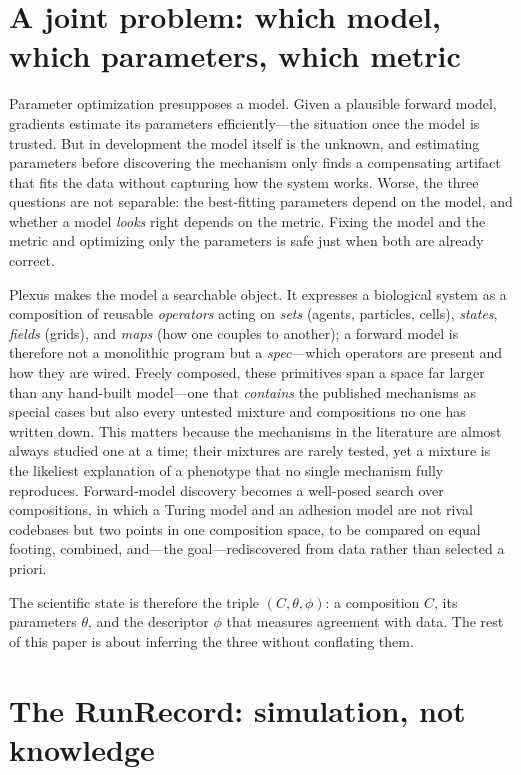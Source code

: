 \documentclass[11pt]{article}
\begin{document}
\section*{A joint problem: which model, which parameters, which metric}

Parameter optimization presupposes a model. Given a plausible forward model, gradients estimate its parameters efficiently---the situation once the model is trusted. But in development the model itself is the unknown, and estimating parameters before discovering the mechanism only finds a compensating artifact that fits the data without capturing how the system works. Worse, the three questions are not separable: the best-fitting parameters depend on the model, and whether a model \emph{looks} right depends on the metric. Fixing the model and the metric and optimizing only the parameters is safe just when both are already correct.

Plexus makes the model a searchable object. It expresses a biological system as a composition of reusable \emph{operators} acting on \emph{sets} (agents, particles, cells), \emph{states}, \emph{fields} (grids), and \emph{maps} (how one couples to another); a forward model is therefore not a monolithic program but a \emph{spec}---which operators are present and how they are wired. Freely composed, these primitives span a space far larger than any hand-built model---one that \emph{contains} the published mechanisms as special cases but also every untested mixture and compositions no one has written down. This matters because the mechanisms in the literature are almost always studied one at a time; their mixtures are rarely tested, yet a mixture is the likeliest explanation of a phenotype that no single mechanism fully reproduces. Forward-model discovery becomes a well-posed search over compositions, in which a Turing model and an adhesion model are not rival codebases but two points in one composition space, to be compared on equal footing, combined, and---the goal---rediscovered from data rather than selected a priori.

The scientific state is therefore the triple $(C,\theta,\phi)$: a composition $C$, its parameters $\theta$, and the descriptor $\phi$ that measures agreement with data. The rest of this paper is about inferring the three without conflating them.

\section*{The RunRecord: simulation, not knowledge}
\end{document}
